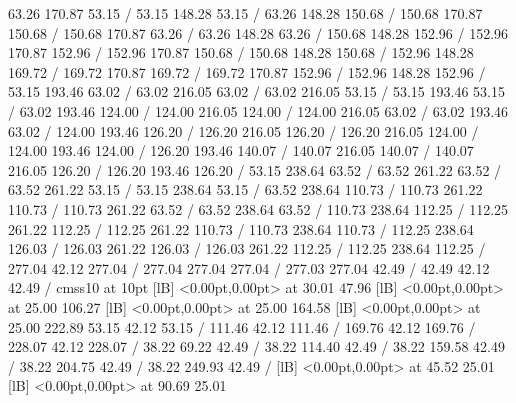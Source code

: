 { 63.26 170.87 53.15 /
 53.15 148.28 53.15 /
\setsolid
{} 63.26 148.28 150.68 /
 150.68 170.87 150.68 /
 150.68 170.87 63.26 /
 63.26 148.28 63.26 /
\setsolid
{} 150.68 148.28 152.96 /
 152.96 170.87 152.96 /
 152.96 170.87 150.68 /
 150.68 148.28 150.68 /
\setsolid
{} 152.96 148.28 169.72 /
 169.72 170.87 169.72 /
 169.72 170.87 152.96 /
 152.96 148.28 152.96 /
\setsolid
{} 53.15 193.46 63.02 /
 63.02 216.05 63.02 /
 63.02 216.05 53.15 /
 53.15 193.46 53.15 /
\setsolid
{} 63.02 193.46 124.00 /
 124.00 216.05 124.00 /
 124.00 216.05 63.02 /
 63.02 193.46 63.02 /
\setsolid
{} 124.00 193.46 126.20 /
 126.20 216.05 126.20 /
 126.20 216.05 124.00 /
 124.00 193.46 124.00 /
\setsolid
{} 126.20 193.46 140.07 /
 140.07 216.05 140.07 /
 140.07 216.05 126.20 /
 126.20 193.46 126.20 /
\setsolid
{} 53.15 238.64 63.52 /
 63.52 261.22 63.52 /
 63.52 261.22 53.15 /
 53.15 238.64 53.15 /
\setsolid
{} 63.52 238.64 110.73 /
 110.73 261.22 110.73 /
 110.73 261.22 63.52 /
 63.52 238.64 63.52 /
\setsolid
{} 110.73 238.64 112.25 /
 112.25 261.22 112.25 /
 112.25 261.22 110.73 /
 110.73 238.64 110.73 /
\setsolid
{} 112.25 238.64 126.03 /
 126.03 261.22 126.03 /
 126.03 261.22 112.25 /
 112.25 238.64 112.25 /
\setsolid
{} 277.04 42.12 277.04 /
 277.04 277.04 277.04 /
 277.03 277.04 42.49 /
 42.49 42.12 42.49 /
\font\picfont cmss10 at 10pt\picfont
{}  [lB] <0.00pt,0.00pt> at 30.01 47.96
  [lB] <0.00pt,0.00pt> at 25.00 106.27
  [lB] <0.00pt,0.00pt> at 25.00 164.58
  [lB] <0.00pt,0.00pt> at 25.00 222.89
\setsolid
{} 53.15 42.12 53.15 /
\setsolid
{} 111.46 42.12 111.46 /
\setsolid
{} 169.76 42.12 169.76 /
\setsolid
{} 228.07 42.12 228.07 /
\setsolid
{} 38.22 69.22 42.49 /
\setsolid
{} 38.22 114.40 42.49 /
\setsolid
{} 38.22 159.58 42.49 /
\setsolid
{} 38.22 204.75 42.49 /
\setsolid
{} 38.22 249.93 42.49 /
  [lB] <0.00pt,0.00pt> at 45.52 25.01
  [lB] <0.00pt,0.00pt> at 90.69 25.01
}
